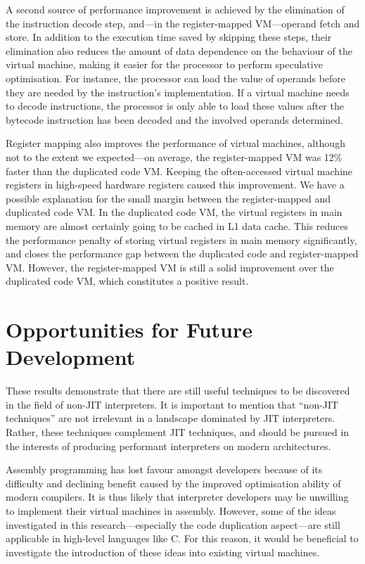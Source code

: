 	A second source of performance improvement is achieved by the elimination of the instruction decode step, and---in the register-mapped VM---operand fetch and store. In addition to the execution time saved by skipping these steps, their elimination also reduces the amount of data dependence on the behaviour of the virtual machine, making it easier for the processor to perform speculative optimisation. For instance, the processor can load the value of operands before they are needed by the instruction's implementation. If a virtual machine needs to decode instructions, the processor is only able to load these values after the bytecode instruction has been decoded and the involved operands determined.
	
	Register mapping also improves the performance of virtual machines, although not to the extent we expected---on average, the register-mapped VM was 12\% faster than the duplicated code VM. Keeping the often-accessed virtual machine registers in high-speed hardware registers caused this improvement. We have a possible explanation for the small margin between the register-mapped and duplicated code VM. In the duplicated code VM, the virtual registers in main memory are almost certainly going to be cached in L1 data cache. This reduces the performance penalty of storing virtual registers in main memory significantly, and closes the performance gap between the duplicated code and register-mapped VM. However, the register-mapped VM is still a solid improvement over the duplicated code VM, which constitutes a positive result.
	
	\section{Opportunities for Future Development}
	These results demonstrate that there are still useful techniques to be discovered in the field of non-JIT interpreters. It is important to mention that ``non-JIT techniques'' are not irrelevant in a landscape dominated by JIT interpreters. Rather, these techniques complement JIT techniques, and should be pursued in the interests of producing performant interpreters on modern architectures.
	
	Assembly programming has lost favour amongst developers because of its difficulty and declining benefit caused by the improved optimisation ability of modern compilers. It is thus likely that interpreter developers may be unwilling to implement their virtual machines in assembly. However, some of the ideas investigated in this research---especially the code duplication aspect---are still applicable in high-level languages like C. For this reason, it would be beneficial to investigate the introduction of these ideas into existing virtual machines.
	
